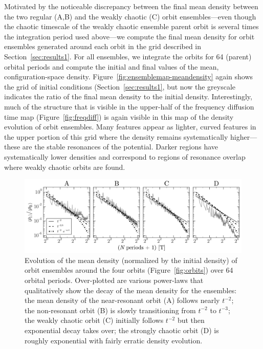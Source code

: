 Motivated by the noticeable discrepancy between the final mean density between the two regular (A,B) and the weakly chaotic (C) orbit ensembles---even though the chaotic timescale of the weakly chaotic ensemble parent orbit is several times the integration period used above---we compute the final mean density for orbit ensembles generated around each orbit in the grid described in Section~\ref{sec:results1}. For all ensembles, we integrate the orbits for 64 (parent) orbital periods and compute the initial and final values of the mean, configuration-space density. Figure~\ref{fig:ensemblemap-meandensity} again shows the grid of initial conditions (Section~\ref{sec:results1}, but now the greyscale indicates the ratio of the final mean density to the initial density. Interestingly, much of the structure that is visible in the upper-half of the frequency diffusion time map (Figure~\ref{fig:freqdiff}) is again visible in this map of the density evolution of orbit ensembles. Many features appear as lighter, curved features in the upper portion of this grid where the density remains systematically higher---these are the stable resonances of the potential. Darker regions have systematically lower densities and correspond to regions of resonance overlap where weakly chaotic orbits are found. 

\begin{figure}[t]%
\begin{center}
\includegraphics[width=\textwidth]{figures/ch3/ensemble-densities.pdf}
\caption{Evolution of the mean density (normalized by the initial density) of orbit ensembles around the four orbits (Figure~\ref{fig:orbits}) over 64 orbital periods. Over-plotted are various power-laws that qualitatively show the decay of the mean density for the ensembles: the mean density of the near-resonant orbit (A) follows nearly $t^{-2}$; the non-resonant orbit (B) is slowly transitioning from $t^{-2}$ to $t^{-3}$; the weakly chaotic orbit (C) initially follows $t^{-2}$ but then exponential decay takes over; the strongly chaotic orbit (D) is roughly exponential with fairly erratic density evolution. }
\label{fig:densities}
\end{center}
\end{figure}

